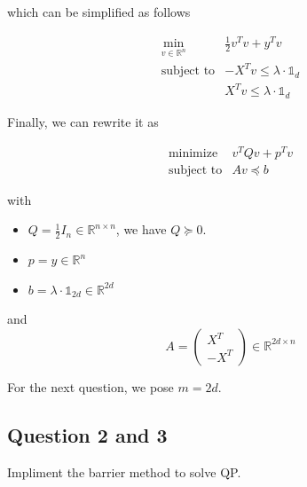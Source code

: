 \documentclass[11pt]{article}
\providecommand{\tightlist}{%
      \setlength{\itemsep}{0pt}\setlength{\parskip}{0pt}}
\begin{document}
which can be simplified as follows

\begin{equation}
\tag{LASSO*}
\begin{array}{ll}
\displaystyle \min_{v \in \mathbb{R}^n} & \frac{1}{2} v^T v  + y^T v \\
\text{subject to} & - X^T v \le \lambda \cdot \mathbb{1}_d \\
& X^T v \le \lambda \cdot \mathbb{1}_d
\end{array}
\end{equation}

Finally, we can rewrite it as

\begin{equation}
\tag{QP}
\begin{array}{ll}
\text{minimize} & v^TQv + p^Tv \\
\text{subject to} & Av \preceq b
\end{array}
\end{equation}

with

\begin{itemize}
\tightlist
\item
  \(Q = \frac{1}{2} I_n \in \mathbb{R}^{n \times n}\), we have
  \(Q \succeq 0\).
\item
  \(p = y \in \mathbb{R}^{n}\)
\item
  \(b = \lambda \cdot \mathbb{1}_{2d} \in \mathbb{R}^{2d}\)
\end{itemize}

and \begin{equation*}
A = \left(
    \begin{array}{c}
    X^T \\
    -X^T
    \end{array}
\right)
\in \mathbb{R}^{2d \times n}
\end{equation*}

For the next question, we pose \(m=2d\).

    \hypertarget{question-2-and-3}{%
\subsection{Question 2 and 3}\label{question-2-and-3}}

    Impliment the barrier method to solve QP.
\end{document}
